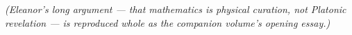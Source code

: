 % 
% 
% 
\textit{(Eleanor's long argument --- that mathematics is physical curation, not Platonic revelation --- is reproduced whole as the companion volume's opening essay.)}

